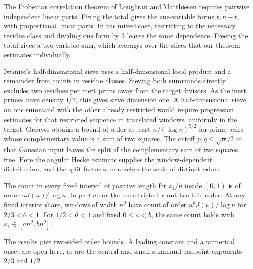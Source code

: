 The Frobenian correlation theorem of Loughran and Matthiesen
\cite[Theorem~1.9]{LM} requires pairwise independent linear parts.
Fixing the total gives the one-variable forms \(t,n-t\), with
proportional linear parts. In the mixed case, restricting to the
necessary residue class and dividing one form by \(3\) leaves
the same dependence. Freeing the total gives a two-variable
sum, which averages over the slices that our theorem estimates
individually.

Iwaniec's half-dimensional sieve \cite[Theorem~1]{IwaniecHalf}
uses a half-dimensional local product and a remainder from
counts in residue classes. Sieving both summands directly
excludes two residues per inert prime away from the target
divisors. As the inert primes have density \(1/2\), this gives
sieve dimension one. A half-dimensional sieve on one summand
with the other already restricted would require progression
estimates for that restricted sequence in translated windows,
uniformly in the target. Greaves \cite[main theorem]{Greaves}
obtains a bound of order at least \(n/(\log n)^{5/2}\) for
prime pairs whose complementary value is a sum of two squares.
The cutoff \(p,q\le\sqrt n/2\) in that Gaussian input leaves the
split of the complementary sum of two squares free. Here the
angular Hecke estimate supplies the window-dependent distribution,
and the split-factor sum reaches the scale of distinct values.

\begin{corollary}\label{cor:ranges}
The count in every fixed interval of positive length for \(s_1/n\)
inside \((0,1)\) is of order \(nJ(n)/\log n\). In particular the
unrestricted count has this order. At any fixed interior share,
windows of width \(n^\theta\) have count of order
\(n^\theta J(n)/\log n\) for \(2/3<\theta<1\).
For \(1/2<\theta<1\) and fixed \(0\le a<b\), the same count holds
with \(s_1\in[a n^\theta,b n^\theta]\).
\end{corollary}

The results give two-sided order bounds. A leading constant and
a numerical onset are open here, as are the central and
small-summand endpoint exponents \(2/3\) and \(1/2\).
